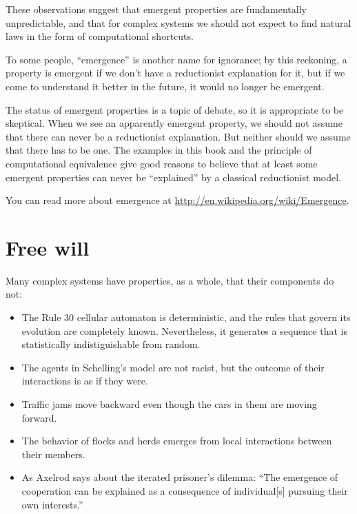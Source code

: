 \documentclass[10pt]{book}
\begin{document}
These observations suggest that emergent properties are fundamentally
unpredictable, and that for complex systems we should not expect to
find natural laws in the form of computational shortcuts.

To some people, ``emergence'' is another name for ignorance; by this
reckoning, a property is emergent if we don't have a reductionist
explanation for it, but if we come to understand it better in the
future, it would no longer be emergent.

The status of emergent properties is a topic of debate, so it is
appropriate to be skeptical.
When we see an apparently emergent property,
we should not assume that there can never be a reductionist explanation.
But neither should we assume that there has to be one.  The examples
in this book and the principle of computational
equivalence give good reasons to believe that at least some
emergent properties can never be ``explained'' by a
classical reductionist model.

You can read more about emergence at
\url{http://en.wikipedia.org/wiki/Emergence}.


\section{Free will}
\label{free.will}

Many complex systems have properties, as a whole, that their
components do not:

\begin{itemize}

\item The Rule 30 cellular automaton is deterministic, and the rules
  that govern its evolution are completely known.  Nevertheless, it
  generates a sequence that is statistically indistiguishable from
  random.

\item The agents in Schelling's model are not racist, but the outcome
  of their interactions is as if they were.

\item Traffic jams move backward even though the cars in them are
  moving forward.

\item The behavior of flocks and herds emerges from local interactions
  between their members.

\item As Axelrod says about the iterated prisoner's dilemma: ``The
  emergence of cooperation can be explained as a consequence of
  individual[s] pursuing their own interests.''

\end{itemize}
\end{document}
